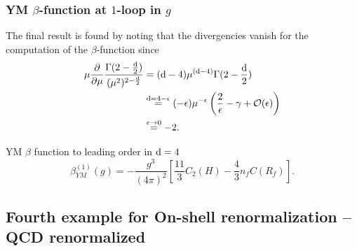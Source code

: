 \subsubsection{YM  $\beta$-function at $1$-loop in $g$}
The final result is found by noting that the divergencies vanish for the computation of the $\beta$-function since
\begin{align*}
	\mu \frac{\partial}{\partial \mu} \frac{\Gamma(2 -\frac{\mathrm{d}}{2})}{(\mu^2)^{2-\frac{\mathrm{d}}{2}} } &= (\mathrm{d} -4) \mu^{(\mathrm{d}-4)} \Gamma(2-\frac{\mathrm{d}}{2}) \\
	&\stackrel{\mathrm{d}=4-\epsilon}{=} (-\epsilon) \mu^{-\epsilon} \left(\frac{2}{\epsilon} -\gamma + \mathcal{O}(\epsilon)\right) \\
	&\stackrel{\epsilon\rightarrow 0}{=} -2.
\end{align*}
\begin{mybox}{YM $\beta$ function to leading order in $\mathrm{d}=4$}
	\begin{equation}
	\label{eq:betafunctionYangMills}
	\beta^{(1)}_{YM}(g) = - \frac{g^3}{(4 \pi)^2} \left[\frac{11}{3} C_2(H) - \frac{4}{3} n_f C(R_f)\right].
	\end{equation}
\end{mybox}



\subsection{Fourth example for On-shell renormalization -- QCD renormalized}
\label{subsec:renormalizationqcd}

